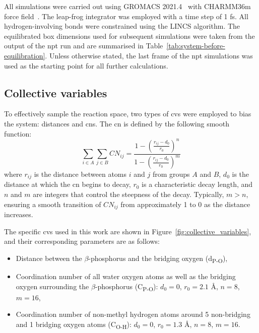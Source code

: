 All simulations were carried out using GROMACS 2021.4~\citep{abrahamGROMACSHighPerformance2015} with CHARMM36m force field~\citep{huangCHARMM36mImprovedForce2017}. The leap-frog integrator was employed with a time step of 1 fs. All hydrogen-involving bonds were constrained using the LINCS algorithm. The equilibrated box dimensions used for subsequent simulations were taken from the output of the \ac{npt} run and are summarised in Table~\ref{tab:system-before-equilibration}. Unless otherwise stated, the last frame of the \ac{npt} simulations was used as the starting point for all further calculations.



\subsection{Collective variables}
To effectively sample the reaction space, two types of \acp{cv} were employed to bias the system: distances and \acp{cn}. The \ac{cn} is defined by the following smooth function:
\begin{equation}
    \sum_{i \in A} \sum_{j \in B} CN_{ij} = \frac{1 - \left( \frac{r_{ij} - d_0}{r_0} \right)^n}{1 - \left( \frac{r_{ij} - d_0}{r_0} \right)^m}
    \label{eq:coordination_number}
\end{equation}
where $r_{ij}$ is the distance between atoms $i$ and $j$ from groups $A$ and $B$, $d_0$ is the distance at which the \ac{cn} begins to decay, $r_0$ is a characteristic decay length, and $n$ and $m$ are integers that control the steepness of the decay. Typically, $m > n$, ensuring a smooth transition of $CN_{ij}$ from approximately 1 to 0 as the distance increases.

The specific \acp{cv} used in this work are shown in Figure~\ref{fig:collective_variables}, and their corresponding parameters are as follows:

\begin{itemize}
    \item Distance between the $\beta$-phosphorus and the bridging oxygen (d\textsubscript{P-O}),
    \item Coordination number of all water oxygen atoms as well as the bridging oxygen surrounding the $\beta$-phosphorus (C\textsubscript{P-O}): $d_0 = 0$, $r_0 = 2.1$ \AA, $n = 8$, $m = 16$,
    \item Coordination number of non-methyl hydrogen atoms around 5 non-bridging and 1 bridging oxygen atoms (C\textsubscript{O-H}): $d_0 = 0$, $r_0 = 1.3$ \AA, $n = 8$, $m = 16$.
\end{itemize}

